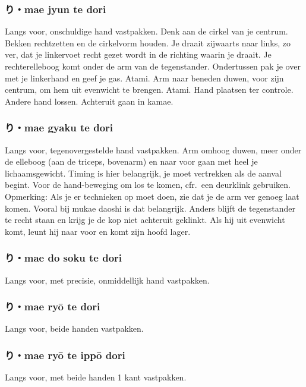 \subsubsection{り・mae jyun te dori}
Langs voor, onschuldige hand vastpakken. Denk aan de cirkel van je centrum. Bekken rechtzetten en de cirkelvorm houden.
Je draait zijwaarts naar links, zo ver, dat je linkervoet recht gezet wordt in de richting waarin je draait. Je rechterelleboog komt onder de arm van de tegenstander. Ondertussen pak je over met je linkerhand en geef je gas. Atami. Arm naar beneden duwen, voor zijn centrum, om hem uit evenwicht te brengen. Atami. Hand plaatsen ter controle. Andere hand lossen. Achteruit gaan in kamae.

\subsubsection{り・mae gyaku te dori}
Langs voor, tegenovergestelde hand vastpakken. Arm omhoog duwen, meer onder de elleboog (aan de triceps, bovenarm) en naar voor gaan met heel je lichaamsgewicht. Timing is hier belangrijk, je moet vertrekken als de aanval begint. Voor de hand-beweging om los te komen, cfr.\ een deurklink gebruiken.\\
\noindent Opmerking: Als je er technieken op moet doen, zie dat je de arm ver genoeg laat komen. Vooral bij mukae daoshi is dat belangrijk. Anders blijft de tegenstander te recht staan en krijg je de kop niet achteruit geklinkt. Als hij uit evenwicht komt, leunt hij naar voor en komt zijn hoofd lager.

\subsubsection{り・mae do soku te dori}
Langs voor, met precisie, onmiddellijk hand vastpakken.

\subsubsection{り・mae ry\={o} te dori}
Langs voor, beide handen vastpakken.

\subsubsection{り・mae ry\={o} te ipp\={o} dori}
Langs voor, met beide handen 1 kant vastpakken.

